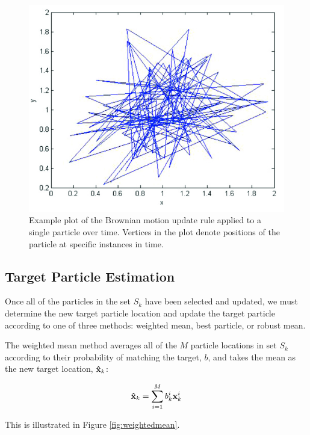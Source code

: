 \documentclass[11pt]{article}
\begin{document}
\begin{figure}[H]
\centering
\includegraphics[scale=.4]{img/brownianmotion.jpg}
\caption{Example plot of the Brownian motion update rule applied to a single particle over time. Vertices in the plot denote positions of the particle at specific instances in time.}
\label{fig:brownianmotion}
\end{figure}



\subsection{Target Particle Estimation}
\label{sec:targetestimation}

Once all of the particles in the set $S_k$ have been selected and updated, we must determine the new target particle location and update the target particle according to one of three methods: weighted mean, best particle, or robust mean.

The weighted mean method averages all of the $M$ particle locations in set $S_k$ according to their probability of matching the target, $b$, and takes the mean as the new target location, ${\bf \hat x}_k$:

\begin{equation}
{\bf \hat x}_k = \sum^M_{i=1} b^i_k {\bf x}^i_k
\label{eq:weightedmean}
\end{equation}


This is illustrated in Figure \ref{fig:weightedmean}.
\end{document}
